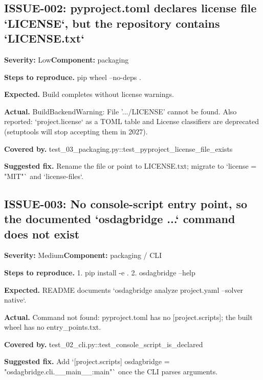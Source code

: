 \subsection*{ISSUE-002: pyproject.\allowbreak{}toml declares license file `LICENSE`, but the repository contains `LICENSE.\allowbreak{}txt`}
\textbf{Severity:} Low\quad \textbf{Component:} packaging\par
\textbf{Steps to reproduce.} pip wheel --no-deps .\allowbreak{}\par
\textbf{Expected.} Build completes without license warnings.\allowbreak{}\par
\textbf{Actual.} BuildBackendWarning: File '.\allowbreak{}.\allowbreak{}.\allowbreak{}/\allowbreak{}LICENSE' cannot be found.\allowbreak{} Also reported: `project.\allowbreak{}license` as a TOML table and License classifiers are deprecated (setuptools will stop accepting them in 2027).\allowbreak{}\par
\textbf{Covered by.} test\_\allowbreak{}03\_\allowbreak{}packaging.\allowbreak{}py::\allowbreak{}test\_\allowbreak{}pyproject\_\allowbreak{}license\_\allowbreak{}file\_\allowbreak{}exists\par
\textbf{Suggested fix.} Rename the file or point to LICENSE.\allowbreak{}txt; migrate to `license = "MIT"` and `license-files`.\allowbreak{}

\subsection*{ISSUE-003: No console-script entry point, so the documented `osdagbridge .\allowbreak{}.\allowbreak{}.\allowbreak{}` command does not exist}
\textbf{Severity:} Medium\quad \textbf{Component:} packaging /\allowbreak{} CLI\par
\textbf{Steps to reproduce.} 1.\allowbreak{} pip install -e .\allowbreak{} 2.\allowbreak{} osdagbridge --help\par
\textbf{Expected.} README documents `osdagbridge analyze project.\allowbreak{}yaml --solver native`.\allowbreak{}\par
\textbf{Actual.} Command not found: pyproject.\allowbreak{}toml has no [project.\allowbreak{}scripts]; the built wheel has no entry\_\allowbreak{}points.\allowbreak{}txt.\allowbreak{}\par
\textbf{Covered by.} test\_\allowbreak{}02\_\allowbreak{}cli.\allowbreak{}py::\allowbreak{}test\_\allowbreak{}console\_\allowbreak{}script\_\allowbreak{}is\_\allowbreak{}declared\par
\textbf{Suggested fix.} Add `[project.\allowbreak{}scripts] osdagbridge = "osdagbridge.\allowbreak{}cli.\allowbreak{}\_\allowbreak{}\_\allowbreak{}main\_\allowbreak{}\_\allowbreak{}:main"` once the CLI parses arguments.\allowbreak{}

